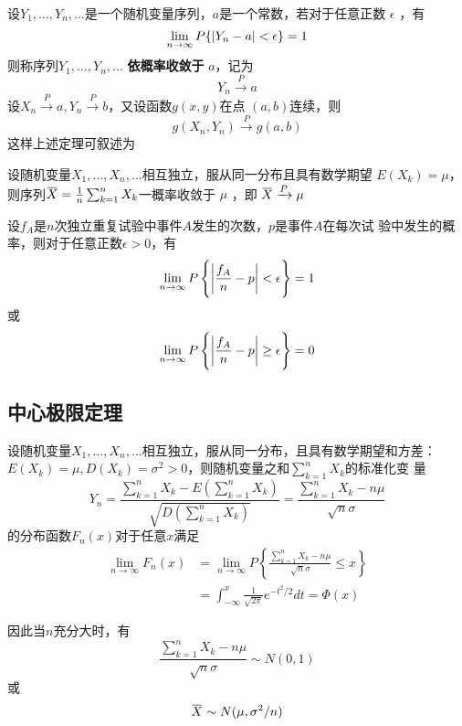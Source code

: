 \documentclass[11pt]{article}
\begin{document}
设\(Y_1,\dots,Y_n,\dots\)是一个随机变量序列，\(a\)是一个常数，若对于任意正数
\(\epsilon\) ，有
\begin{equation*}
\lim_{n\to\infty}P\{\abs{Y_n-a}<\epsilon\}=1
\end{equation*}
则称序列\(Y_1,\dots,Y_n,\dots\) \textbf{依概率收敛于} \(a\)，记为
\begin{equation*}
Y_n\xrightarrow{P}a
\end{equation*}
设\(X_n\xrightarrow{P}a,Y_n\xrightarrow{P}b\)，又设函数\(g(x,y)\)在点
\((a,b)\)连续，则
\begin{equation*}
g(X_n,Y_n)\xrightarrow{P}g(a,b)
\end{equation*}
这样上述定理可叙述为
\begin{theorem}
设随机变量\(X_1,\dots,X_n,\dots\)相互独立，服从同一分布且具有数学期望
\(E(X_k)=\mu\)，则序列\(\bbar{X}=\frac{1}{n}\sum_{k=1}^nX_k\)一概率收敛于 \(\mu\)
，即 \(\bbar{X}\xrightarrow{P}\mu\)
\end{theorem}

\begin{theorem}[伯努利大数定理]
设\(f_A\)是\(n\)次独立重复试验中事件\(A\)发生的次数，\(p\)是事件\(A\)在每次试
验中发生的概率，则对于任意正数\(\epsilon>0\)，有
\begin{equation*}
\lim_{n\to\infty}P\left\{
\abs{\frac{f_A}{n}-p}<\epsilon
\right\}=1
\end{equation*}
或
\begin{equation*}
\lim_{n\to\infty}P\left\{
\abs{\frac{f_A}{n}-p}\ge \epsilon
\right\}=0
\end{equation*}
\end{theorem}
\subsection{中心极限定理}
\label{sec:orgb5d66c3}
\begin{theorem}[独立同分布的中心极限定理]
设随机变量\(X_1,\dots,X_n,\dots\)相互独立，服从同一分布，且具有数学期望和方差：
\(E(X_k)=\mu,D(X_k)=\sigma^2>0\)，则随机变量之和\(\sum_{k=1}^nX_k\)的标准化变
量
\begin{equation*}
Y_n=\frac{\sum_{k=1}^nX_k-E(\sum_{k=1}^nX_k)}{\sqrt{D(\sum_{k=1}^nX_k)}}=
\frac{\sum_{k=1}^nX_k-n\mu}{\sqrt{n}\sigma}
\end{equation*}
的分布函数\(F_n(x)\)对于任意\(x\)满足
\begin{align*}
\lim_{n\to\infty}F_n(x)&=
\lim_{n\to\infty}P\left\{
\frac{\sum_{k=1}^nX_k-n\mu}{\sqrt{n}\sigma}
\le x
\right\}\\
&=\int_{-\infty}^x\frac{1}{\sqrt{2\pi}}e^{-t^2/2}dt=\Phi(x)
\end{align*}
\end{theorem}
因此当\(n\)充分大时，有
\begin{equation*}
\frac{\sum_{k=1}^nX_k-n\mu}{\sqrt{n}\sigma}\sim N(0,1)
\end{equation*}
或
\begin{equation*}
\bbar{X}\sim N(\mu,\sigma^2/n)
\end{equation*}
\end{document}
